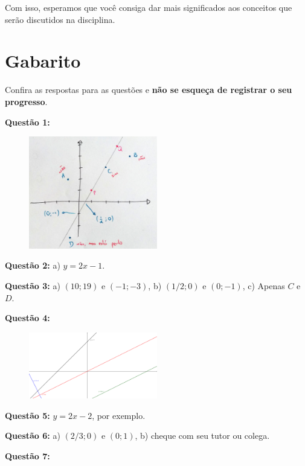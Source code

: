 \documentclass[main_estudante.tex]{subfiles}
\begin{document}
Com isso, esperamos que você consiga dar mais significados aos conceitos que serão discutidos na disciplina.

\newpage

\section{Gabarito}

Confira as respostas para as questões e \textbf{não se esqueça de registrar o seu progresso}.

\noindent\textbf{Questão 1:} 

\begin{figure}[h]
\centering
\includegraphics[width=0.5\textwidth]{./img/c6g1.jpg}
\end{figure}

\noindent\textbf{Questão 2:} a) $y=2x-1$.

\noindent\textbf{Questão 3:} a) $(10;19)$ e $(-1;-3)$, b) $(1/2;0)$ e $(0;-1)$, c) Apenas $C$ e $D$.

\noindent\textbf{Questão 4:} 

\begin{figure}[h]
\centering
\includegraphics[width=0.5\textwidth]{./img/c6g4.png}
\end{figure}

\noindent\textbf{Questão 5:} $y=2x-2$, por exemplo.

\noindent\textbf{Questão 6:} a) $(2/3;0)$ e $(0;1)$, b) cheque com seu tutor ou colega.

\noindent\textbf{Questão 7:} 
\end{document}
